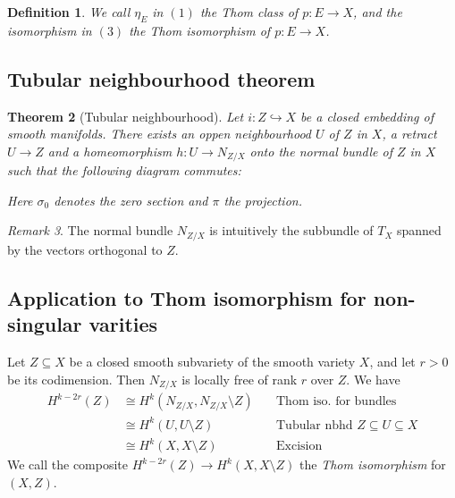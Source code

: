 \documentclass[A4paper, british, reqno]{amsart}
\theoremstyle{darkgreentheorem}
\newtheorem{thm}{Theorem}[section]
\theoremstyle{darkbluedefinition}
\newtheorem{defn}[thm]{Definition}
\theoremstyle{darkredexample}
\theoremstyle{remark}
\newtheorem{rem}[thm]{Remark}
\newcommand{\1}{\mathbbm{1}}
\newcommand{\sub}{\subseteq}
\newcommand{\mono}{\hookrightarrow}
\begin{document}
\begin{defn}
    We call $\eta_{E}$ in $(1)$ the \textit{Thom class} of $p\colon E\to X$, and the isomorphism in $(3)$ the \textit{Thom isomorphism} of $p\colon E\to X$.
\end{defn}

\subsection{Tubular neighbourhood theorem}

\begin{thm}[Tubular neighbourhood]
    Let $i\colon Z\mono X$ be a closed embedding of smooth manifolds.
    There exists an oppen neighbourhood $U$ of $Z$ in $X$, a retract $U\to Z$ and a homeomorphism $h\colon U\to N_{Z/X}$ onto the normal bundle of $Z$ in $X$ such that the following diagram commutes:
    \begin{center}
    \end{center}
    Here $\sigma_{0}$ denotes the zero section and $\pi$ the projection.
\end{thm}

\begin{rem}
    The normal bundle $N_{Z/X}$ is intuitively the subbundle of $T_{X}$ spanned by the vectors orthogonal to $Z$.
\end{rem}

\subsection{Application to Thom isomorphism for non-singular varities}

Let $Z\sub X$ be a closed smooth subvariety of the smooth variety $X$, and let $r>0$ be its codimension.
Then $N_{Z/X}$ is locally free of rank $r$ over $Z$.
We have
\begin{align*}
    H^{k-2r}(Z) & \cong H^{k}(N_{Z/X},N_{Z/X}\setminus Z) & \quad \text{Thom iso. for bundles} \\
    & \cong H^{k}(U,U\setminus Z) & \quad \text{Tubular nbhd } Z\sub U\sub X \\
    & \cong H^{k}(X,X\setminus Z) & \quad \text{Excision}
\end{align*}
We call the composite $H^{k-2r}(Z)\to H^{k}(X,X\setminus Z)$ the \textit{Thom isomorphism} for $(X,Z)$.
\end{document}
